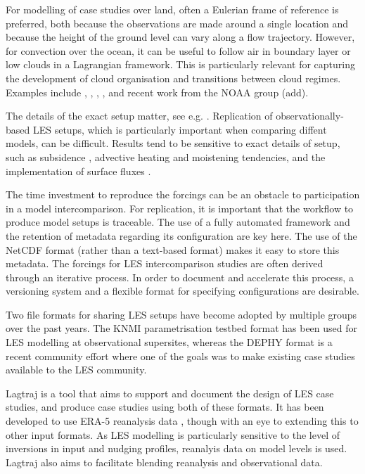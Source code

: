 \documentclass[a4paper,11pt]{article}
\begin{document}
For modelling of case studies over land, often a Eulerian frame of
reference is preferred, both because the observations are made around a
single location and because the height of the ground level can vary
along a flow trajectory. However, for convection over the ocean, it can
be useful to follow air in boundary layer or low clouds in a Lagrangian
framework. This is particularly relevant for capturing the development
of cloud organisation and transitions between cloud regimes. Examples
include \cite{bretherton1999}, \cite{roode2016}, \cite{tomassini2017},
\cite{mohrmann2019}, \cite{neggers2019} and recent work from the NOAA group
(add).

The details of the exact setup matter, see e.g. \cite{smalley2019}.
Replication of observationally-based LES setups, which is particularly
important when comparing diffent models, can be difficult. Results tend
to be sensitive to exact details of setup, such as subsidence
\citep{hohenegger2013,kurowski2020}, advective heating and moistening
tendencies, and the implementation of surface fluxes
\citep{stevens2001}.

The time investment to reproduce the forcings can be an obstacle to
participation in a model intercomparison. For replication, it is
important that the workflow to produce model setups is traceable. The
use of a fully automated framework and the retention of metadata
regarding its configuration are key here. The use of the NetCDF format
(rather than a text-based format) makes it easy to store this metadata.
The forcings for LES intercomparison studies are often derived through
an iterative process. In order to document and accelerate this process,
a versioning system and a flexible format for specifying configurations
are desirable.

Two file formats for sharing LES setups have become adopted by multiple
groups over the past years. The KNMI parametrisation testbed format has
been used for LES modelling at observational supersites, whereas the
DEPHY format is a recent community effort where one of the goals was to
make existing case studies available to the LES community.

Lagtraj is a tool that aims to support and document the design of LES
case studies, and produce case studies using both of these formats. It
has been developed to use ERA-5 reanalysis data \citep{hersbach2020},
though with an eye to extending this to other input formats. As LES
modelling is particularly sensitive to the level of inversions in input
and nudging profiles, reanalyis data on model levels is used. Lagtraj
also aims to facilitate blending reanalysis and observational data.
\end{document}
